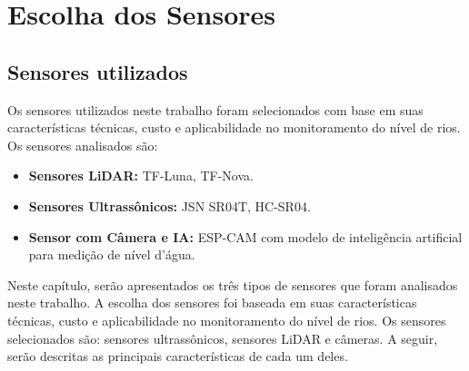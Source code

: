 \chapter{Escolha dos Sensores}\label{cap:sensores}




\section{Sensores utilizados}
Os sensores utilizados neste trabalho foram selecionados com base em suas características técnicas, custo e aplicabilidade no monitoramento do nível de rios. Os sensores analisados são:
\begin{itemize}
    \item \textbf{Sensores LiDAR:} TF-Luna, TF-Nova.
    \item \textbf{Sensores Ultrassônicos:} JSN SR04T, HC-SR04.
    \item \textbf{Sensor com Câmera e IA:} ESP-CAM com modelo de inteligência artificial para medição de nível d'água.
\end{itemize}
Neste capítulo, serão apresentados os três tipos de sensores que foram analisados neste trabalho. A escolha dos sensores foi baseada em suas características técnicas, custo e aplicabilidade no monitoramento do nível de rios. Os sensores selecionados são: sensores ultrassônicos, sensores LiDAR e câmeras. A seguir, serão descritas as principais características de cada um deles.



